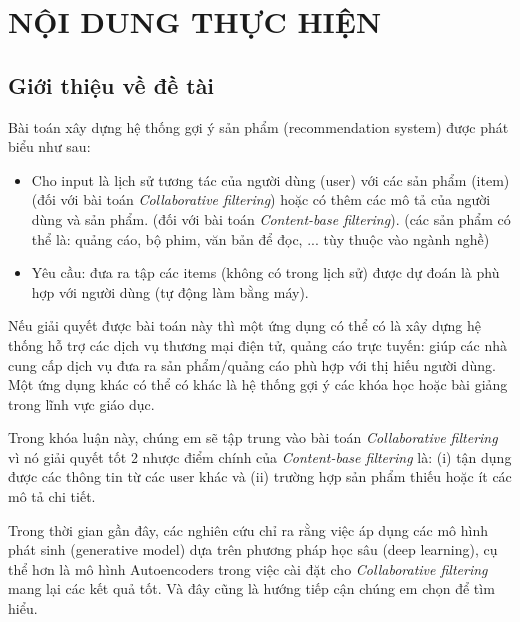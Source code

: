 \documentclass{article}[14pt]
\begin{document}
    \section{NỘI DUNG THỰC HIỆN}
    {

    
    \subsection{Giới thiệu về đề tài}
    
    
      Bài toán xây dựng hệ thống gợi ý sản phẩm (recommendation system) được phát biểu như sau:
      \begin{itemize}
          \item Cho input là lịch sử tương tác của người dùng (user)  với 
          các sản phẩm (item) (đối với bài toán \textit{Collaborative filtering}) 
          hoặc có thêm các mô tả của người dùng và sản phẩm. 
          (đối với bài toán \textit{Content-base filtering}).
          (các sản phẩm có thể là: quảng cáo, bộ phim, văn bản để đọc, ... tùy thuộc vào ngành nghề)
          \item Yêu cầu: đưa ra tập các items (không có trong lịch sử) 
          được dự đoán là phù hợp với người dùng (tự động làm bằng máy).
      \end{itemize}
      Nếu giải quyết được bài toán này thì một ứng dụng có thể có là xây dựng 
      hệ thống hỗ trợ các dịch vụ thương mại điện tử, quảng cáo trực tuyến: 
      giúp các nhà cung cấp dịch vụ đưa ra sản phẩm/quảng cáo phù hợp với 
      thị hiếu người dùng. Một ứng dụng khác có thể có khác là hệ thống gợi ý các 
      khóa học hoặc bài giảng trong lĩnh vực giáo dục.

      Trong khóa luận này, chúng em sẽ tập trung vào bài toán 
      \textit{Collaborative filtering} vì nó giải quyết tốt 2 nhược điểm chính 
      của \textit{Content-base filtering} là: 
      (i) tận dụng được các thông tin từ các user khác và 
      (ii) trường hợp sản phẩm thiếu hoặc ít các mô tả chi tiết.
      
      Trong thời gian gần đây, các nghiên cứu chỉ ra rằng việc áp dụng các 
      mô hình phát sinh (generative model) dựa trên phương pháp học sâu 
      (deep learning), cụ thể hơn là mô hình Autoencoders trong việc cài đặt cho 
      \textit{Collaborative filtering} mang lại các kết quả tốt. 
      Và đây cũng là hướng tiếp cận chúng em chọn để tìm hiểu.

}
\end{document}
